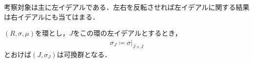 	考察対象は主に左イデアルである．左右を反転させれば左イデアルに関する結果は右イデアルにも当てはまる．
	
	\begin{screen}
		\begin{thm}[左イデアルは加法に関して群をなす]
			$(R,\sigma,\mu)$を環とし，$J$をこの環の左イデアルとするとき，
			\begin{align}
				\sigma_J \coloneqq \sigma|_{J \times J}
			\end{align}
			とおけば$(J,\sigma_J)$は可換群となる．
		\end{thm}
	\end{screen}
	
	
	